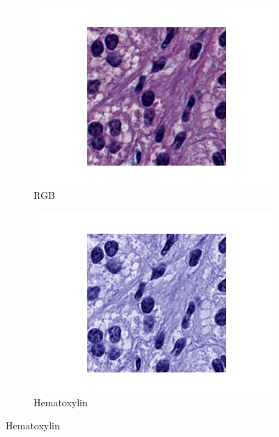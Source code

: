 \documentclass[target=bach,aauheader=,style=]{thud}
\begin{document}
\begin{figure}[h!]
    \centering
    \begin{subfigure}{0.45\textwidth}
        \centering
        \includegraphics[width=\linewidth]{imgs/RGB.png}
        \caption{RGB}
    \end{subfigure}
    \hspace{0.2cm}
    \begin{subfigure}{0.45\textwidth}
        \centering
        \includegraphics[width=\linewidth]{imgs/HE.png}
        \caption{Hematoxylin}
    \end{subfigure}
    
    \vspace{0.4cm} %
    

\end{figure}
\end{document}
